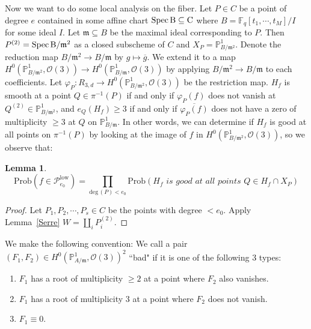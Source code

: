 \documentclass[12pt]{article}
\theoremstyle{plain}
\newtheorem{lemma}[equation]{Lemma}
\theoremstyle{definition}
\newcommand{\fm}{\mathfrak{m}}
\newcommand{\IF}{\mathbb{F}}
\newcommand{\IP}{\mathbb{P}}
\newcommand{\sO}{\mathcal{O}}
\newcommand{\sP}{\mathcal{P}}
\renewcommand{\deg}{\mathrm{deg}\,}
\newcommand{\Spec}{\rm Spec\,}
\newcommand\wb{\overline}
\newcommand{\<}{\langle}
\renewcommand{\>}{\rangle}
\newcommand{\Prob}{\mathrm{Prob}}
\begin{document}
Now we want to do some local analysis on the fiber. Let $P \in C$ be a point of degree $e$ contained in some affine chart $\Spec B \subseteq C$ where $ B = \IF_q[t_1, \cdots, t_M]/I$ for some ideal $I$. Let $\fm \subseteq B$ be the maximal ideal corresponding to $P$. Then $P^{(2)} = \Spec B/\fm^2$ as a closed subscheme of $C$ and $X_P = \IP^1_{B/\fm^2}$. Denote the reduction map $B/\fm^2 \to B/\fm$ by $g \mapsto \overline{g}$. We extend it to a map $H^0(\IP^1_{B/\fm^2}, \sO(3)) \to H^0(\IP^1_{B/\fm}, \sO(3))$ by applying $B/\fm^2 \to B/\fm$ to each coefficients. Let $\varphi_P : R_{3, d} \to H^0(\IP^1_{B/\fm^2}, \sO(3))$ be the restriction map. $H_f$ is smooth at a point $Q \in \pi^{-1}(P)$ if and only if $\varphi_P(f)$ does not vanish at $Q^{(2)} \in \IP^1_{B/\fm^2}$, and $e_Q(H_f) \ge 3$ if and only if $\wb{\varphi_P(f)}$ does not have a zero of multiplicity $\ge 3$ at $Q$ on $\IP^1_{B/\fm}$. In other words, we can determine if $H_f$ is good at all points on $\pi^{-1}(P)$ by looking at the image of $f$ in $H^0(\IP^1_{B/\fm^2}, \sO(3))$, so we observe that:

\begin{lemma}
\label{Low}
$$\Prob(f \in \sP_{e_0}^{\mathrm{low}})  = \prod_{\deg(P) < e_0}  \Prob( H_f \textit{ is good at all points } Q \in H_f \cap X_P ) $$
\end{lemma}
\begin{proof}
Let $P_1, P_2, \cdots, P_s \in C$ be the points with degree $< e_0$. Apply Lemma~\ref{Serre} $W = \coprod_i P_i^{(2)}$. 
\end{proof}

We make the following convention:
 We call a pair $(F_1, F_2) \in H^0(\IP^1_{A/\fm}, \sO(3))^2$ ``bad" if it is one of the following 3 types:
\begin{enumerate}
\item $F_1$ has a root of multiplicity $\ge 2$ at a point where $F_2$ also vanishes. 
\item $F_1$ has a root of multiplicity $3$ at a point where $F_2$ does not vanish. 
\item $F_1 \equiv 0$.
\end{enumerate}
\end{document}

